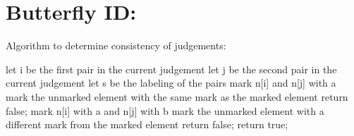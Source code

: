 \documentclass{article}
\begin{document}
\section{Butterfly ID:}
Algorithm to determine consistency of judgements:\\
\begin{algorithmic}
    \STATE let i be the first pair in the current judgement
    \STATE let j be the second pair in the current judgement
    \STATE let s be the labeling of the pairs
                \STATE mark n[i] and n[j] with a
                \STATE mark the unmarked element with the same mark as the marked element
                \STATE return false;
            \ENDIF
        \ENDIF
                \STATE mark n[i] with a and n[j] with b
                \STATE mark the unmarked element with a different mark from the marked element
                \STATE return false;
            \ENDIF
        \ENDIF
\ENDFOR
\STATE return true;
\end{algorithmic}\\
\end{document}
